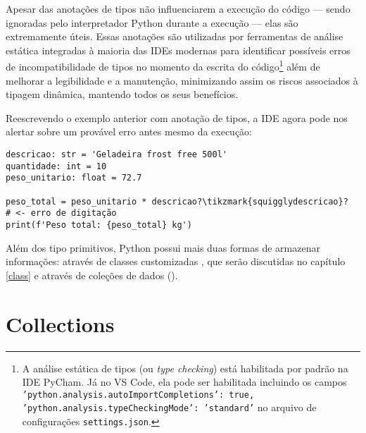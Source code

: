 Apesar das anotações de tipos não influenciarem a execução do código --- sendo ignoradas pelo interpretador Python
durante a execução --- elas são extremamente úteis.
Essas anotações são utilizadas por ferramentas de análise estática integradas à maioria das IDEs modernas para
identificar possíveis erros de incompatibilidade de tipos no momento da escrita do
código\footnote{A análise estática de tipos (ou \emph{type checking}) está habilitada por padrão na IDE PyCham.
Já no VS Code, ela pode ser habilitada incluindo os campos
\texttt{'python.analysis.autoImportCompletions': true,} \texttt{'python.analysis.typeCheckingMode': 'standard'} no arquivo de
configurações \texttt{settings.json}.
}
além de melhorar a legibilidade e a manutenção, minimizando assim os riscos associados à tipagem dinâmica, mantendo
todos os seus benefícios.

Reescrevendo o exemplo anterior com anotação de tipos, a IDE agora pode nos alertar sobre um provável erro antes
mesmo da execução:
\begin{verbatim}
descricao: str = 'Geladeira frost free 500l'
quantidade: int = 10
peso_unitario: float = 72.7

peso_total = peso_unitario * descricao?\tikzmark{squigglydescricao}?   # <- erro de digitação
print(f'Peso total: {peso_total} kg')
\end{verbatim}
%

Além dos tipo primitivos, Python possui mais duas formas de armazenar informações: através de classes customizadas
, que serão discutidas no capítulo \ref{class} e através de coleções de
dados ().




\section{Collections}

